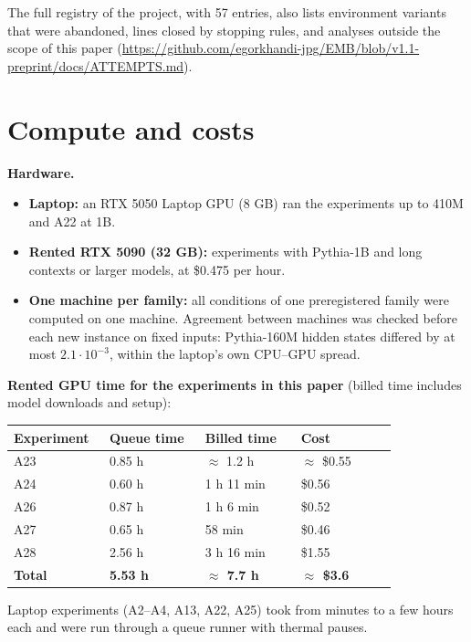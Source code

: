 \documentclass[11pt]{article}
\begin{document}
The full registry of the project, with 57 entries, also lists environment variants that were abandoned, lines closed by stopping rules, and analyses outside the scope of this paper (\url{https://github.com/egorkhandi-jpg/EMB/blob/v1.1-preprint/docs/ATTEMPTS.md}).

\section{Compute and costs}



\textbf{Hardware.}
\begin{itemize}
\item \textbf{Laptop:} an RTX 5050 Laptop GPU (8 GB) ran the experiments up to 410M and A22 at 1B.
\item \textbf{Rented RTX 5090 (32 GB):} experiments with Pythia-1B and long contexts or larger models, at \$0.475 per hour.
\item \textbf{One machine per family:} all conditions of one preregistered family were computed on one machine. Agreement between machines was checked before each new instance on fixed inputs: Pythia-160M hidden states differed by at most $2.1\cdot 10^{-3}$, within the laptop's own CPU--GPU spread.
\end{itemize}

\textbf{Rented GPU time for the experiments in this paper} (billed time includes model downloads and setup):

\begin{center}\small\begin{tabular}{p{0.23\linewidth} p{0.23\linewidth} p{0.23\linewidth} p{0.23\linewidth}}\hline
\textbf{Experiment} & \textbf{Queue time} & \textbf{Billed time} & \textbf{Cost} \\ \hline
A23 & 0.85 h & $\approx$ 1.2 h & $\approx$ \$0.55 \\
A24 & 0.60 h & 1 h 11 min & \$0.56 \\
A26 & 0.87 h & 1 h 6 min & \$0.52 \\
A27 & 0.65 h & 58 min & \$0.46 \\
A28 & 2.56 h & 3 h 16 min & \$1.55 \\
\textbf{Total} & \textbf{5.53 h} & \textbf{$\approx$ 7.7 h} & \textbf{$\approx$ \$3.6} \\
\hline\end{tabular}\end{center}

Laptop experiments (A2--A4, A13, A22, A25) took from minutes to a few hours each and were run through a queue runner with thermal pauses.
\end{document}
